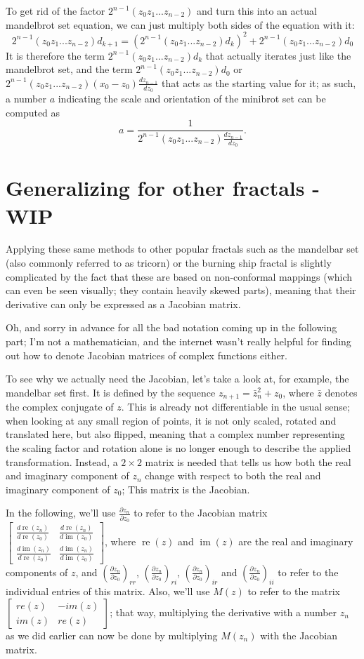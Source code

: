 \documentclass[12pt,a4paper]{article}
\newcommand{\mat}[1]{\begin{bmatrix} #1 \end{bmatrix}}
\newcommand{\jmat}[2]{\frac{\partial #1}{\partial #2}}
\DeclareMathOperator{\re}{re}
\DeclareMathOperator{\im}{im}
\begin{document}
To get rid of the factor $2^{n-1}(z_0z_1...z_{n-2})$ and turn this into an actual mandelbrot set equation, we can just multiply both sides of the equation with it:
$$2^{n-1}(z_0z_1...z_{n-2})d_{k+1}=(2^{n-1}(z_0z_1...z_{n-2})d_k)^2+2^{n-1}(z_0z_1...z_{n-2})d_0$$
It is therefore the term $2^{n-1}(z_0z_1...z_{n-2})d_k$ that actually iterates just like the mandelbrot set, and the term $2^{n-1}(z_0z_1...z_{n-2})d_0$ or $2^{n-1}(z_0z_1...z_{n-2})(x_0-z_0)\frac{dz_{n-1}}{dz_0}$ that acts as the starting value for it; as such, a number $a$ indicating the scale and orientation of the minibrot set can be computed as $$a=\frac{1}{2^{n-1}(z_0z_1...z_{n-2})\frac{dz_{n-1}}{dz_0}}.$$

\section{Generalizing for other fractals - WIP}

Applying these same methods to other popular fractals such as the mandelbar set (also commonly referred to as tricorn) or the burning ship fractal is slightly complicated by the fact that these are based on non-conformal mappings (which can even be seen visually; they contain heavily skewed parts), meaning that their derivative can only be expressed as a Jacobian matrix.

Oh, and sorry in advance for all the bad notation coming up in the following part; I'm not a mathematician, and the internet wasn't really helpful for finding out how to denote Jacobian matrices of complex functions either.

To see why we actually need the Jacobian, let's take a look at, for example, the mandelbar set first. It is defined by the sequence $z_{n+1} = \bar{z}_n^2+z_0$, where $\bar{z}$ denotes the complex conjugate of $z$. This is already not differentiable in the usual sense; when looking at any small region of points, it is not only scaled, rotated and translated here, but also flipped, meaning that a complex number representing the scaling factor and rotation alone is no longer enough to describe the applied transformation. Instead, a $2\times2$ matrix is needed that tells us how both the real and imaginary component of $z_n$ change with respect to both the real and imaginary component of $z_0$; This matrix is the Jacobian.

In the following, we'll use $\frac{\partial z_n}{\partial z_0}$ to refer to the Jacobian matrix $\mat{\frac{d\re(z_n)}{d\re(z_0)}&\frac{d\re(z_n)}{d\im(z_0)}\\\frac{d\im(z_n)}{d\re(z_0)}&\frac{d\im(z_n)}{d\im(z_0)}}$, where $\re(z)$ and $\im(z)$ are the real and imaginary components of $z$, and $(\jmat{z_n}{z_0})_{rr}$, $(\jmat{z_n}{z_0})_{ri}$, $(\jmat{z_n}{z_0})_{ir}$ and $(\jmat{z_n}{z_0})_{ii}$ to refer to the individual entries of this matrix. Also, we'll use $M(z)$ to refer to the matrix $\mat{re(z)&-im(z)\\im(z)&re(z)}$; that way, multiplying the derivative with a number $z_n$ as we did earlier can now be done by multiplying $M(z_n)$ with the Jacobian matrix.
\end{document}
